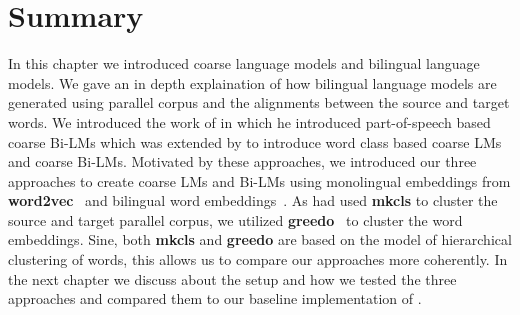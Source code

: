 \section{Summary}
In this chapter we introduced coarse language models and bilingual language models. We gave an in depth explaination of how bilingual language models are generated using parallel corpus and the alignments between the source and target words. We introduced the work of \cite{Niehues2011} in which he introduced part-of-speech based coarse Bi-LMs which was extended by \cite{Stewart2014} to introduce word class based coarse LMs and coarse Bi-LMs. Motivated by these approaches, we introduced our three approaches to create coarse LMs and Bi-LMs using monolingual embeddings from \textbf{word2vec}~\cite{Mikolov2013a} and bilingual word embeddings~\cite{Hermann14}. As \cite{Stewart2014} had used \textbf{mkcls} to cluster the source and target parallel corpus, we utilized \textbf{greedo}~\cite{Stratos2014} to cluster the word embeddings. Sine, both \textbf{mkcls} and \textbf{greedo} are based on the \cite{Brown1992} model of hierarchical clustering of words, this allows us to compare our approaches more coherently. In the next chapter we discuss about the setup and how we tested the three approaches and compared them to our baseline implementation of \cite{Stewart2014}.

